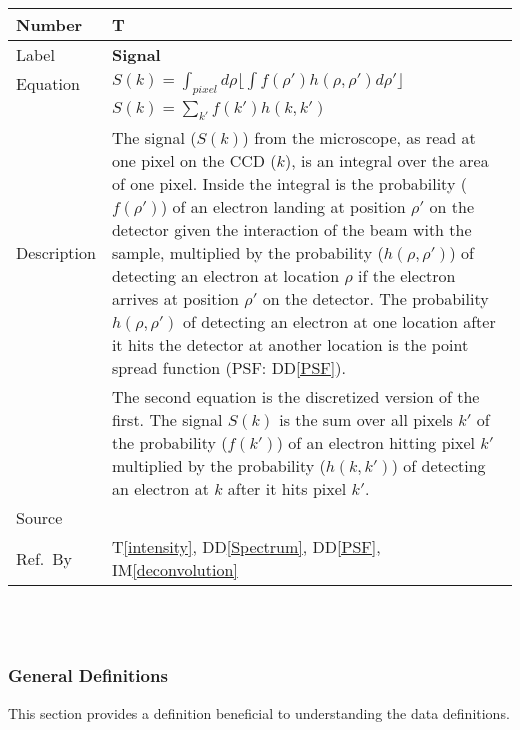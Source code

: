 \documentclass[12pt]{article}
\newcommand{\colAwidth}{0.13\textwidth}
\newcommand{\colBwidth}{0.82\textwidth}
\newcommand{\ddref}[1]{DD\ref{#1}}
\newcounter{theorynum} %
\newcommand{\tref}[1]{T\ref{#1}}
\newcommand{\iref}[1]{IM\ref{#1}}
\begin{document}
\noindent
\begin{minipage}{\textwidth}
	\renewcommand*{\arraystretch}{1.5}
	\begin{tabular}{| p{\colAwidth} | p{\colBwidth}|}
		  \hline
		  \rowcolor[gray]{0.9}
		  Number& T{theorynum}\thetheorynum \label{signal}\\
		  \hline
		  Label&\bf Signal \\
		  \hline
		  Equation& $S(k)=\int_{pixel}d\rho \lfloor \int f(\rho') h(\rho, \rho')
d\rho' \rfloor$ \\
		  & $ S(k)=\sum_{k'} f(k') h(k, k')$\\
		  \hline
		  Description & The signal ($S(k)$) from the microscope, as read at one pixel
on the CCD ($k$), is an integral over the area of one pixel. Inside the integral
is the probability ($f(\rho')$) of an electron landing at position $\rho'$ on
the detector given the interaction of the beam with the sample, multiplied by
the probability ($h(\rho, \rho')$) of detecting an electron at location $\rho$
if the electron arrives at position $\rho'$ on the detector. The probability
$h(\rho, \rho')$ of detecting an electron at one location after it hits the
detector at another location is the point spread function (PSF: \ddref{PSF}).\\
		  & The second equation is the discretized version of the first. The signal
$S(k)$ is the sum over all pixels $k'$ of the probability ($f(k')$) of an
electron hitting pixel $k'$ multiplied by the probability ($h(k, k')$) of
detecting an electron at $k$ after it hits pixel $k'$.\\
		  \hline
		  Source & \cite{zuo_electron_2000}\\
		  \hline
		  Ref.\ By & \tref{intensity}, \ddref{Spectrum}, \ddref{PSF},
\iref{deconvolution}\\
		  \hline
	\end{tabular}
\end{minipage}\\

~\newline

\subsubsection{General Definitions}\label{sec_gendef}

This section provides a definition beneficial to understanding the data
definitions.

~\newline
\end{document}
